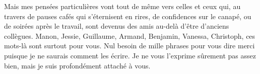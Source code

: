 \documentclass[a4paper]{book}
\begin{document}
Mais mes pensées particulières vont tout de même vers celles et ceux qui, au travers de pauses cafés qui s'éternisent en rires, de confidences sur le canapé, ou de soirées après le travail, sont devenus des amis au-delà d'être d'anciens collègues. Manon, Jessie, Guillaume, Armand, Benjamin, Vanessa, Christoph, ces mots-là sont surtout pour vous. Nul besoin de mille phrases pour vous dire merci puisque je ne saurais comment les écrire. %
Je ne vous l'exprime sûrement pas assez bien, mais je suis profondément attaché à vous.








\end{document}
